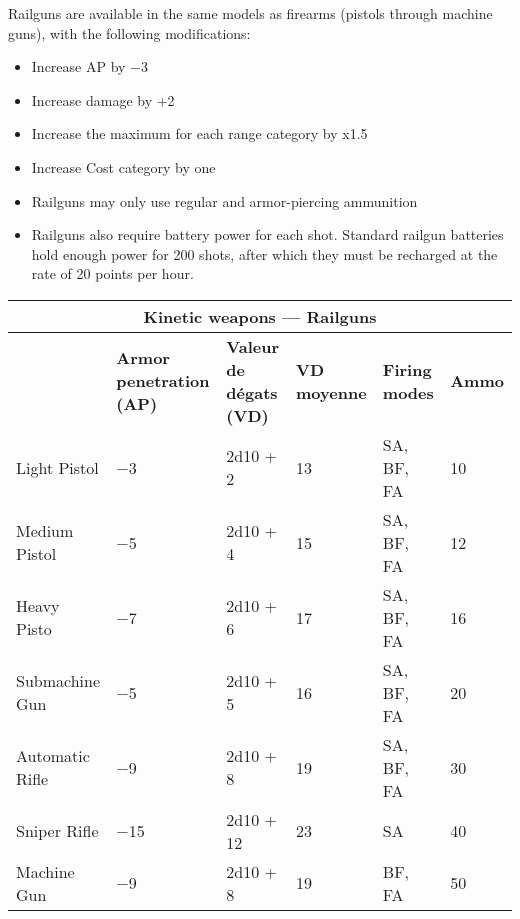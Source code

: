 Railguns are available in the same models as firearms (pistols through machine guns), with the following modifications: 

\begin{itemize} \item Increase AP by $-$3 \item Increase damage by +2 \item Increase the maximum for each range category by x1.5 \item Increase Cost category by one \item Railguns may only use regular and armor-piercing ammunition \item Railguns also require battery power for each shot. Standard railgun batteries hold enough power for 200 shots, after which they must be recharged at the rate of 20 points per hour. \end{itemize} 

\begin{table} \begin{tabularx}{\textwidth}{|l|X|X|X|X|l|} \hline

\multicolumn{6}{|c|}{\textbf{Kinetic weapons --- Railguns}} \\ \hline

&\textbf{Armor penetration (AP)}	&\textbf{Valeur de dégats (VD)}	&\textbf{VD moyenne}	&\textbf{Firing modes}	&\textbf{Ammo} \\ \hline

Light Pistol	&$-$3	&2d10 + 2	&13	&SA, BF, FA	&10 \\ \hline

Medium Pistol	&$-$5	&2d10 + 4	&15	&SA, BF, FA	&12 \\ \hline

Heavy Pisto	&$-$7	&2d10 + 6	&17	&SA, BF, FA	&16 \\ \hline

Submachine Gun &$-$5	&2d10 + 5	&16	&SA, BF, FA	&20 \\ \hline

Automatic Rifle	&$-$9	&2d10 + 8	&19	&SA, BF, FA	&30 \\ \hline

Sniper Rifle	&$-$15	&2d10 + 12	&23	&SA	&40 \\ \hline

Machine Gun	&$-$9	&2d10 + 8	&19	&BF, FA	&50 \\ \hline

\end{tabularx} \label{tab:kinetic-railguns} \end{table} 

